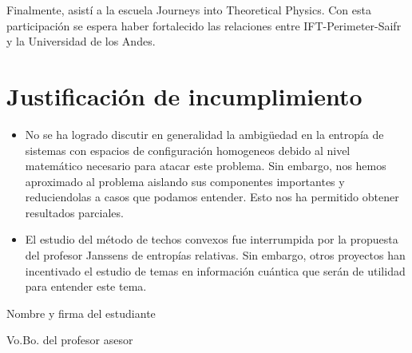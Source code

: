 \documentclass{article}
\begin{document}
Finalmente, asistí a la escuela Journeys into Theoretical Physics. Con esta participación se espera haber fortalecido las relaciones entre IFT-Perimeter-Saifr y la Universidad de los Andes.


\section{Justificación de incumplimiento}

\begin{itemize}

\item No se ha logrado discutir en generalidad la ambigüedad en la entropía de sistemas con espacios de configuración homogeneos debido al nivel matemático necesario para atacar este problema. Sin embargo, nos hemos aproximado al problema aislando sus componentes importantes y reduciendolas a casos que podamos entender. Esto nos ha permitido obtener resultados parciales.

\item El estudio del método de techos convexos fue interrumpida por la propuesta del profesor Janssens de entropías relativas. Sin embargo, otros proyectos han incentivado el estudio de temas en información cuántica que serán de utilidad para entender este tema.

\end{itemize}

\vspace{1.5cm}
Nombre y firma del estudiante

\vspace{1.5cm}
Vo.Bo. del profesor asesor



\end{document}
